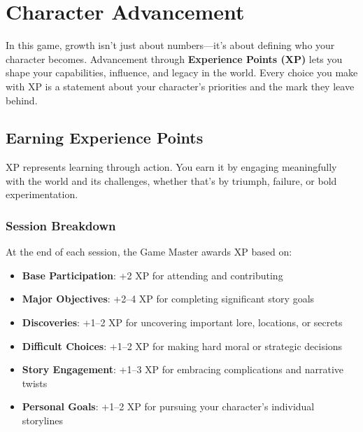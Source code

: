 
\chapter{Character Advancement}
\label{ch:advancement}

\begin{multicols}{2}

In this game, growth isn't just about numbers—it's about defining who your character becomes. Advancement through \textbf{Experience Points (XP)} lets you shape your capabilities, influence, and legacy in the world. Every choice you make with XP is a statement about your character’s priorities and the mark they leave behind.

\section{Earning Experience Points}

XP represents learning through action. You earn it by engaging meaningfully with the world and its challenges, whether that’s by triumph, failure, or bold experimentation.

\subsection*{Session Breakdown}
At the end of each session, the Game Master awards XP based on:

\begin{itemize}
\item \textbf{Base Participation}: +2 XP for attending and contributing
\item \textbf{Major Objectives}: +2–4 XP for completing significant story goals
\item \textbf{Discoveries}: +1–2 XP for uncovering important lore, locations, or secrets
\item \textbf{Difficult Choices}: +1–2 XP for making hard moral or strategic decisions
\item \textbf{Story Engagement}: +1–3 XP for embracing complications and narrative twists
\item \textbf{Personal Goals}: +1–2 XP for pursuing your character's individual storylines
\end{itemize}


\end{multicols}
